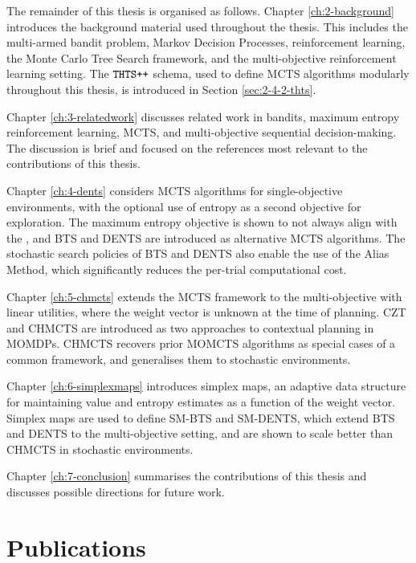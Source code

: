     The remainder of this thesis is organised as follows. Chapter \ref{ch:2-background} introduces the background material used throughout the thesis. This includes the multi-armed bandit problem, Markov Decision Processes, reinforcement learning, the Monte Carlo Tree Search framework, and the multi-objective reinforcement learning setting. The ${\textnormal{\texttt{THTS++}}}$ schema, used to define MCTS algorithms modularly throughout this thesis, is introduced in Section \ref{sec:2-4-2-thts}.

    Chapter \ref{ch:3-relatedwork} discusses related work in bandits, maximum entropy reinforcement learning, MCTS, and multi-objective sequential decision-making. The discussion is brief and focused on the references most relevant to the contributions of this thesis.

    Chapter \ref{ch:4-dents} considers MCTS algorithms for single-objective environments, with the optional use of entropy as a second objective for exploration. The maximum entropy objective is shown to not always align with the , and BTS and DENTS are introduced as alternative MCTS algorithms. The stochastic search policies of BTS and DENTS also enable the use of the Alias Method, which significantly reduces the per-trial computational cost.

    Chapter \ref{ch:5-chmcts} extends the MCTS framework to the multi-objective  with linear utilities, where the weight vector is unknown at the time of planning. CZT and CHMCTS are introduced as two approaches to contextual planning in MOMDPs. CHMCTS recovers prior MOMCTS algorithms as special cases of a common framework, and generalises them to stochastic environments.

    Chapter \ref{ch:6-simplexmaps} introduces simplex maps, an adaptive data structure for maintaining value and entropy estimates as a function of the weight vector. Simplex maps are used to define SM-BTS and SM-DENTS, which extend BTS and DENTS to the multi-objective setting, and are shown to scale better than CHMCTS in stochastic environments.

    Chapter \ref{ch:7-conclusion} summarises the contributions of this thesis and discusses possible directions for future work.



\section{Publications}
\label{sec:1-5-publications}

